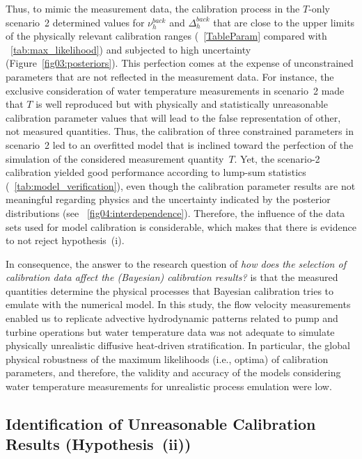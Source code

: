 \documentclass[draft,linenumbers,onecolumn]{agujournal2019} %
\begin{document}
Thus, to mimic the measurement data, the calibration process in the $T$-only scenario~2 determined values for $\nu_{h}^{back}$ and $\Delta_{h}^{back}$ that are close to the upper limits of the physically relevant calibration ranges (\tablename{~\ref{TableParam}} compared with \tablename{~\ref{tab:max_likelihood}}) and subjected to high uncertainty (Figure~\ref{fig03:posteriors}). This perfection comes at the expense of unconstrained parameters that are not reflected in the measurement data. For instance, the exclusive consideration of water temperature measurements in scenario~2 made that $T$ is well reproduced but with physically and statistically unreasonable calibration parameter values that will lead to the false representation of other, not measured quantities. Thus, the calibration of three constrained parameters in scenario~2 led to an overfitted model that is inclined toward the perfection of the simulation of the considered measurement quantity~$T$. Yet, the scenario-2 calibration yielded good performance according to lump-sum statistics (\tablename{~\ref{tab:model_verification}}), even though the calibration parameter results are not meaningful regarding physics and the uncertainty indicated by the posterior distributions (see \figurename{~\ref{fig04:interdependence}}). Therefore, the influence of the data sets used for model calibration is considerable, which makes that there is evidence to not reject hypothesis~(i).

In consequence, the answer to the research question of \textit{how does the selection of calibration data affect the (Bayesian) calibration results?} is that the measured quantities determine the physical processes that Bayesian calibration tries to emulate with the numerical model. In this study, the flow velocity measurements enabled us to replicate advective hydrodynamic patterns related to pump and turbine operations but water temperature data was not adequate to simulate physically unrealistic diffusive heat-driven stratification. In particular, the global physical robustness of the maximum likelihoods (i.e., optima) of calibration parameters, and therefore, the validity and accuracy of the models considering water temperature measurements for unrealistic process emulation were low.


\subsection{Identification of Unreasonable Calibration Results (Hypothesis~(ii))}
\end{document}
